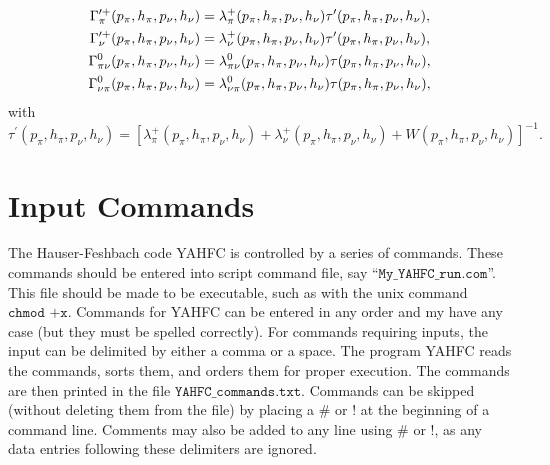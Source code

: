 \documentclass[
10pt,
showpacs,preprintnumbers,footinbib,
amsfonts,amsmath,amssymb,
aps,
prc,twocolumn,groupedaddress,superscriptaddress,
showkeys,
nofootinbib
]{revtex4-1}
\begin{document}
\begin{widetext}
\begin{align}
\Gamma_\pi^{\prime +}(p_\pi, h_\pi, p_\nu, h_\nu) & = \lambda_\pi^+(p_\pi, h_\pi, p_\nu, h_\nu) \tau^\prime(p_\pi, h_\pi, p_\nu, h_\nu), \notag \\
\Gamma_\nu^{\prime +}(p_\pi, h_\pi, p_\nu, h_\nu) & = \lambda_\nu^+(p_\pi, h_\pi, p_\nu, h_\nu) \tau^\prime(p_\pi, h_\pi, p_\nu, h_\nu), \notag \\
\Gamma^0_{\pi\nu}(p_\pi, h_\pi, p_\nu, h_\nu) & = \lambda_{\pi\nu}^0(p_\pi, h_\pi, p_\nu, h_\nu) \tau(p_\pi, h_\pi, p_\nu, h_\nu), \notag \\
\Gamma^0_{\nu\pi}(p_\pi, h_\pi, p_\nu, h_\nu) & = \lambda_{\nu\pi}^0(p_\pi, h_\pi, p_\nu, h_\nu) \tau(p_\pi, h_\pi, p_\nu, h_\nu),
\end{align}
with
\begin{equation}
\tau^\prime(p_\pi, h_\pi, p_\nu, h_\nu) = \left [ \lambda_\pi^+(p_\pi, h_\pi, p_\nu, h_\nu) + \lambda_\nu^+(p_\pi, h_\pi, p_\nu, h_\nu) + 
                                                                        W(p_\pi, h_\pi, p_\nu, h_\nu) \right ]^{-1}.
\end{equation}

\end{widetext}


\section{Input Commands}
\label{App:Commands}
The Hauser-Feshbach code YAHFC is controlled by a series of commands. These commands should be entered into script command file, say ``${\texttt{My\_YAHFC\_run.com}}$''. This file should be made to be executable, such as with the unix command ${\texttt{chmod +x}}$. Commands for YAHFC can be entered in any order and my have any case (but they must be spelled correctly). For commands requiring inputs, the input can be delimited by either a comma or a space. The program YAHFC reads the commands, sorts them, and orders them for proper execution. The commands are then printed in the file 
${\texttt{YAHFC\_commands.txt}}$. Commands can be skipped (without deleting them from the file) by placing a \# or ! at the beginning of a command line. Comments may also be added to any line using \# or !, as any data entries following these delimiters are ignored. 
\end{document}
